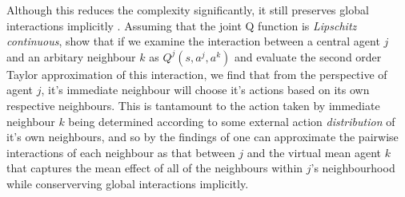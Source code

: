 Although this reduces the complexity significantly, it still preserves global interactions implicitly
\cite{Blume1993}. Assuming that the joint Q function is \emph{Lipschitz continuous}, \cite{Yang2018}
show that if we examine the interaction between a central agent $j$ and an arbitary neighbour $k$ as $Q^j(s,a^j,a^k)$
and evaluate the second order Taylor approximation of this interaction, we find that from
the perspective of agent $j$, it's immediate neighbour will choose it's actions based on its
own respective neighbours. This is tantamount to the action taken by immediate neighbour $k$ being determined
according to some external action \emph{distribution} of it's own neighbours, and so by the findings of \cite{Blume1993}
one can approximate the pairwise interactions of each neighbour as that between $j$
and the virtual mean agent $k$ that captures the mean effect of all of the neighbours within $j$'s neighbourhood
while conserverving global interactions implicitly.\\

